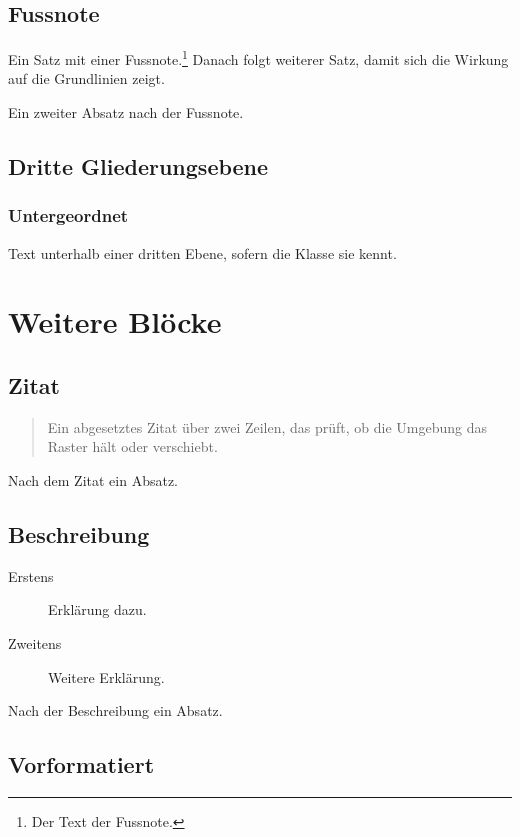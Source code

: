 \documentclass{swisstex}
\begin{document}
\subsection{Fussnote}

Ein Satz mit einer Fussnote.\footnote{Der Text der Fussnote.} Danach folgt
weiterer Satz, damit sich die Wirkung auf die Grundlinien zeigt.

Ein zweiter Absatz nach der Fussnote.

\subsection{Dritte Gliederungsebene}

\subsubsection{Untergeordnet}

Text unterhalb einer dritten Ebene, sofern die Klasse sie kennt.

\section{Weitere Blöcke}

\subsection{Zitat}

\begin{quote}
Ein abgesetztes Zitat über zwei Zeilen, das prüft, ob die Umgebung das
Raster hält oder verschiebt.
\end{quote}

Nach dem Zitat ein Absatz.

\subsection{Beschreibung}

\begin{description}
\item[Erstens] Erklärung dazu.
\item[Zweitens] Weitere Erklärung.
\end{description}

Nach der Beschreibung ein Absatz.

\subsection{Vorformatiert}
\end{document}
